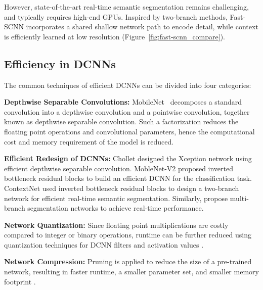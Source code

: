 \documentclass[10pt,twocolumn,letterpaper]{article}
\begin{document}
However, state-of-the-art real-time semantic segmentation remains challenging, and typically requires high-end GPUs. Inspired by two-branch methods, Fast-SCNN incorporates a shared shallow network path to encode detail, while context is efficiently learned at low resolution (Figure~\ref{fig:fast-scnn_compare}).

\subsection{Efficiency in DCNNs}

The common techniques of efficient DCNNs can be divided into four categories:

\textbf{Depthwise Separable Convolutions:} MobileNet~\cite{mobilenet-howard2017} decomposes a standard convolution into a depthwise convolution and a  pointwise convolution, together known as depthwise separable convolution. Such a factorization reduces the floating point operations and convolutional parameters, hence the computational cost and memory requirement of the model is reduced.

\textbf{Efficient Redesign of DCNNs:} Chollet \cite{xception-net-chollet2016} designed the Xception network using efficient depthwise separable convolution. MobleNet-V2 proposed inverted bottleneck residual blocks \cite{inverted-res-bottlenecks-sandler2018} to build an efficient DCNN for the classification task. ContextNet \cite{contextnet-poudel2018} used inverted bottleneck residual blocks to design a two-branch network for efficient real-time semantic segmentation. Similarly, \cite{BiSeNet-yu2018,gun-mazzini2018,icnet-zhao2017b} propose multi-branch segmentation networks to achieve real-time performance.
  
\textbf{Network Quantization:} Since floating point multiplications are costly compared to integer or binary operations, runtime can be further reduced using quantization techniques for DCNN filters and activation values \cite{hubara2016,xnornet-rastegari2016,wu2018}.
    
\textbf{Network Compression:} Pruning is applied to reduce the size of a pre-trained network, resulting in faster runtime, a smaller parameter set, and smaller memory footprint \cite{contextnet-poudel2018,deep-compression-han2016,pruning-fliters-li2017}. 
\end{document}

